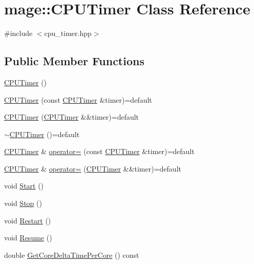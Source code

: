 \hypertarget{classmage_1_1_c_p_u_timer}{}\section{mage\+:\+:C\+P\+U\+Timer Class Reference}
\label{classmage_1_1_c_p_u_timer}


{\ttfamily \#include $<$cpu\+\_\+timer.\+hpp$>$}

\subsection*{Public Member Functions}
\begin{DoxyCompactItemize}
\item 
\hyperlink{classmage_1_1_c_p_u_timer_a398b1d5c99bcb09fbe37b2d74547b3e0}{C\+P\+U\+Timer} ()
\item 
\hyperlink{classmage_1_1_c_p_u_timer_a35d279dc760a491537099262892c62d5}{C\+P\+U\+Timer} (const \hyperlink{classmage_1_1_c_p_u_timer}{C\+P\+U\+Timer} \&timer)=default
\item 
\hyperlink{classmage_1_1_c_p_u_timer_a1f416a6188d447fb24396cc4409af7aa}{C\+P\+U\+Timer} (\hyperlink{classmage_1_1_c_p_u_timer}{C\+P\+U\+Timer} \&\&timer)=default
\item 
\hyperlink{classmage_1_1_c_p_u_timer_a32583449026cf0589104767339486d4b}{$\sim$\+C\+P\+U\+Timer} ()=default
\item 
\hyperlink{classmage_1_1_c_p_u_timer}{C\+P\+U\+Timer} \& \hyperlink{classmage_1_1_c_p_u_timer_aa453ec0f437762bff5c33ea344329d10}{operator=} (const \hyperlink{classmage_1_1_c_p_u_timer}{C\+P\+U\+Timer} \&timer)=default
\item 
\hyperlink{classmage_1_1_c_p_u_timer}{C\+P\+U\+Timer} \& \hyperlink{classmage_1_1_c_p_u_timer_aee546b06c3b665bc1868abc3d7e3a06d}{operator=} (\hyperlink{classmage_1_1_c_p_u_timer}{C\+P\+U\+Timer} \&\&timer)=default
\item 
void \hyperlink{classmage_1_1_c_p_u_timer_aa6ee4ede4066d447f4205d51bd0b8442}{Start} ()
\item 
void \hyperlink{classmage_1_1_c_p_u_timer_a2fb7ae3c902fc590f48ed1c56e1cc447}{Stop} ()
\item 
void \hyperlink{classmage_1_1_c_p_u_timer_af9668358f3a1d6db3e0f1f608d269ec8}{Restart} ()
\item 
void \hyperlink{classmage_1_1_c_p_u_timer_ae82cf4b83a4968e24ef49961745acd79}{Resume} ()
\item 
double \hyperlink{classmage_1_1_c_p_u_timer_af7027d8e6d4c63fd75c207357b3ff2c1}{Get\+Core\+Delta\+Time\+Per\+Core} () const

\end{DoxyCompactItemize}

